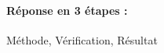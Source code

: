 \documentclass[11pt,a4paper]{article}
\begin{document}

\paragraph{Réponse en 3 étapes :}\mbox{} Méthode, Vérification, Résultat



\end{document}
